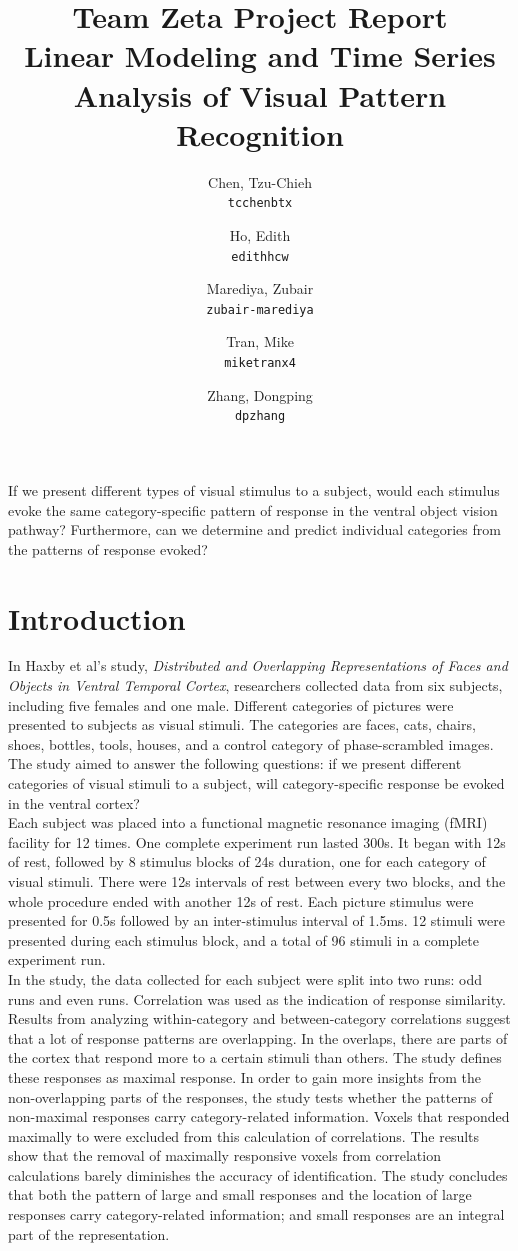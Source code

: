 \documentclass[11pt,twocolumn]{article}
\title{\textbf{Team Zeta Project Report}\\
Linear Modeling and Time Series Analysis of Visual Pattern Recognition}\\
\author{
  Chen, Tzu-Chieh\\
  \texttt{tcchenbtx}
  \and
  Ho, Edith\\
  \texttt{edithhcw}
  \and
  Marediya, Zubair\\
  \texttt{zubair-marediya}
  \and
  Tran, Mike\\
  \texttt{miketranx4}
  \and
  Zhang, Dongping\\
  \texttt{dpzhang}
}
\begin{document}
\maketitle

\abstract{}
If we present different types of 
visual stimulus to a subject, would each stimulus evoke the 
same category-specific pattern of response in the ventral object vision 
pathway? Furthermore, can we determine and predict individual
categories from the patterns of response evoked? 

\section{Introduction}

In Haxby et al's study, \emph{Distributed and Overlapping Representations of Faces
and Objects in Ventral Temporal Cortex}\cite{objectrec}, researchers collected data 
from six subjects, including five females and one male. 
Different categories of pictures were presented to subjects as visual stimuli.
The categories are faces, cats, chairs, shoes, bottles, tools, houses, 
and a control category of phase-scrambled images.
The study aimed to answer the following questions: if we present 
different categories of visual stimuli to a subject, will category-specific response be 
evoked in the ventral cortex? \\

Each subject was placed into a functional magnetic resonance imaging 
(fMRI) facility for 12 times. One complete experiment run lasted 300s. It began 
with 12s of rest, followed by 8 stimulus blocks of 24s duration, one for 
each category of visual stimuli. There were 12s intervals of rest between 
every two blocks, and the whole procedure ended with another 12s of rest. 
Each picture stimulus were presented for 0.5s followed by an inter-stimulus 
interval of 1.5ms. 12 stimuli were presented during each stimulus 
block, and a total of 96 stimuli in a complete experiment run.\\

In the study, the data collected for each subject were split into two 
runs: odd runs and even runs. Correlation was used as the indication of 
response similarity. Results from analyzing within-category and 
between-category correlations suggest that a lot of response patterns 
are overlapping. In the overlaps, there are parts of the cortex that respond 
more to a certain stimuli than others. The study defines these responses as 
maximal response. In order to gain more insights from the non-overlapping 
parts of the responses, the study tests whether the patterns of non-maximal 
responses carry category-related information. Voxels that responded maximally 
to were excluded from this calculation of correlations. The results show that the 
removal of maximally responsive voxels from correlation calculations 
barely diminishes the accuracy of identification. The study concludes 
that both the pattern of large and small responses and the location 
of large responses carry category-related information; and small responses 
are an integral part of the representation.\\
\end{document}
